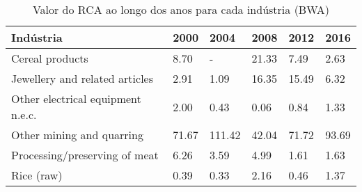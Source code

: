 \begin{table}
\centering
\caption{Valor do RCA ao longo dos anos para cada indústria (BWA)}
\label{tab:ex3-tempo-BWA}
\begin{tabular}{p{6cm}p{1.5cm}p{1.5cm}p{1.5cm}p{1.5cm}p{1.5cm}}
\toprule
                        Indústria &  2000 &   2004 &  2008 &  2012 &  2016 \\
\midrule
                  Cereal products &  8.70 &      - & 21.33 &  7.49 &  2.63 \\
   Jewellery and related articles &  2.91 &   1.09 & 16.35 & 15.49 &  6.32 \\
Other electrical equipment n.e.c. &  2.00 &   0.43 &  0.06 &  0.84 &  1.33 \\
        Other mining and quarring & 71.67 & 111.42 & 42.04 & 71.72 & 93.69 \\
    Processing/preserving of meat &  6.26 &   3.59 &  4.99 &  1.61 &  1.63 \\
                       Rice (raw) &  0.39 &   0.33 &  2.16 &  0.46 &  1.37 \\
\bottomrule
\end{tabular}
\end{table}
